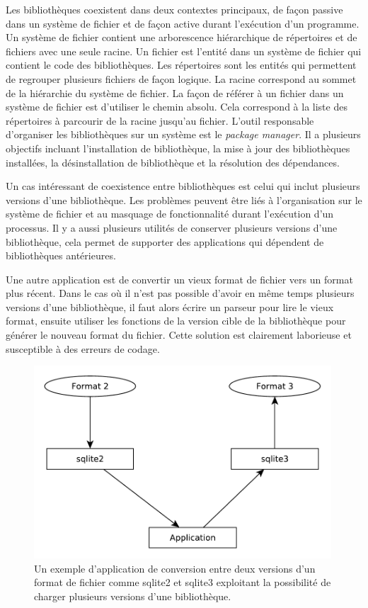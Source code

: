 Les bibliothèques coexistent dans deux contextes principaux, de façon passive
dans un système de fichier et de façon active durant l'exécution d'un
programme.  Un système de fichier contient une arborescence hiérarchique de
répertoires et de fichiers avec une seule racine. Un fichier est l'entité dans
un système de fichier qui contient le code des bibliothèques.  Les répertoires
sont les entités qui permettent de regrouper plusieurs fichiers de façon logique.
La racine correspond au sommet de la hiérarchie du système de fichier. La façon
de référer à un fichier dans un système de fichier est d'utiliser le chemin
absolu. Cela correspond à la liste des répertoires à parcourir de la racine
jusqu'au fichier. L'outil responsable d'organiser les bibliothèques sur un
système est le \textit{package manager}. Il a plusieurs objectifs incluant
l'installation de bibliothèque, la mise à jour des bibliothèques installées, la
désinstallation de bibliothèque et la résolution des dépendances.

Un cas intéressant de coexistence entre bibliothèques est celui qui inclut
plusieurs versions d'une bibliothèque. Les problèmes peuvent être liés à
l'organisation sur le système de fichier et au masquage de fonctionnalité
durant l'exécution d'un processus.  Il y a aussi plusieurs utilités de
conserver plusieurs versions d'une bibliothèque, cela permet de supporter des
applications qui dépendent de bibliothèques antérieures.

Une autre application est de convertir un vieux format de fichier vers un
format plus récent. Dans le cas où il n'est pas possible d'avoir en même temps
plusieurs versions d'une bibliothèque, il faut alors écrire un parseur pour
lire le vieux format, ensuite utiliser les fonctions de la version cible de la
bibliothèque pour générer le nouveau format du fichier.  Cette solution est
clairement laborieuse et susceptible à des erreurs de codage.

\begin{figure}[ht]
  \includegraphics[width=30em]{figures/app_convert_v1_to_v2.pdf}
  \caption{Un exemple d'application de conversion entre deux versions d'un format
  de fichier comme sqlite2 et sqlite3 exploitant la possibilité de charger plusieurs
  versions d'une bibliothèque.}
\end{figure}

